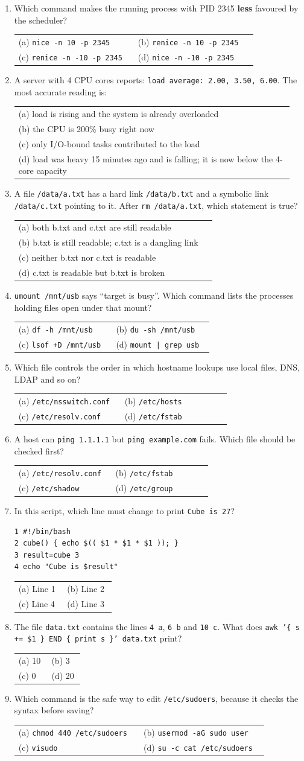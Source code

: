 \documentclass[11pt,a4paper]{article}
\makeatletter
\newcommand{\opts}[4]{\par\nopagebreak\vspace{2pt}%
\begin{tabular}{@{}p{0.47\linewidth}p{0.47\linewidth}@{}}
(a) #1 & (b) #2\\ (c) #3 & (d) #4\end{tabular}}
\newcommand{\optl}[4]{\par\nopagebreak\vspace{2pt}%
\begin{tabular}{@{}p{0.95\linewidth}@{}}
(a) #1\\ (b) #2\\ (c) #3\\ (d) #4\end{tabular}}
\makeatother
\begin{document}
\begin{enumerate}[resume]
\item Which command makes the running process with PID 2345 \textbf{less} favoured by the scheduler?
\opts{\texttt{nice -n 10 -p 2345}}{\texttt{renice -n 10 -p 2345}}{\texttt{renice -n -10 -p 2345}}{\texttt{nice -n -10 -p 2345}}
\item A server with 4 CPU cores reports: \texttt{load average: 2.00, 3.50, 6.00}. The most accurate reading is:
\optl{load is rising and the system is already overloaded}{the CPU is 200\% busy right now}{only I/O-bound tasks contributed to the load}{load was heavy 15 minutes ago and is falling; it is now below the 4-core capacity}
\item A file \texttt{/data/a.txt} has a hard link \texttt{/data/b.txt} and a symbolic link \texttt{/data/c.txt} pointing to it. After \texttt{rm /data/a.txt}, which statement is true?
\optl{both b.txt and c.txt are still readable}{b.txt is still readable; c.txt is a dangling link}{neither b.txt nor c.txt is readable}{c.txt is readable but b.txt is broken}
\item \texttt{umount /mnt/usb} says ``target is busy''. Which command lists the processes holding files open under that mount?
\opts{\texttt{df -h /mnt/usb}}{\texttt{du -sh /mnt/usb}}{\texttt{lsof +D /mnt/usb}}{\texttt{mount | grep usb}}
\item Which file controls the order in which hostname lookups use local files, DNS, LDAP and so on?
\opts{\texttt{/etc/nsswitch.conf}}{\texttt{/etc/hosts}}{\texttt{/etc/resolv.conf}}{\texttt{/etc/fstab}}
\item A host can \texttt{ping 1.1.1.1} but \texttt{ping example.com} fails. Which file should be checked first?
\opts{\texttt{/etc/resolv.conf}}{\texttt{/etc/fstab}}{\texttt{/etc/shadow}}{\texttt{/etc/group}}
\item In this script, which line must change to print \texttt{Cube is 27}?
\begin{verbatim}
1 #!/bin/bash
2 cube() { echo $(( $1 * $1 * $1 )); }
3 result=cube 3
4 echo "Cube is $result"
\end{verbatim}
\opts{Line 1}{Line 2}{Line 4}{Line 3}
\item The file \texttt{data.txt} contains the lines \texttt{4 a}, \texttt{6 b} and \texttt{10 c}. What does \texttt{awk '\{ s += \$1 \} END \{ print s \}' data.txt} print?
\opts{10}{3}{0}{20}
\item Which command is the safe way to edit \texttt{/etc/sudoers}, because it checks the syntax before saving?
\opts{\texttt{chmod 440 /etc/sudoers}}{\texttt{usermod -aG sudo user}}{\texttt{visudo}}{\texttt{su -c cat /etc/sudoers}}

\end{enumerate}
\end{document}
